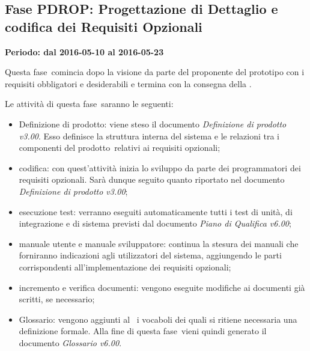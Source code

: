 \documentclass[../PianoProgetto.tex]{subfiles}
\begin{document}
	\subsection{Fase PDROP: Progettazione di Dettaglio e codifica dei Requisiti Opzionali}
		\textbf{Periodo: dal 2016-05-10 al 2016-05-23}
		
		Questa fase\g\ comincia dopo la visione da parte del proponente del prototipo con i requisiti obbligatori e desiderabili e termina con la consegna della \revisionediqualifica .

		Le attività di questa fase\g\ saranno le seguenti:
		\begin{itemize}
			\item Definizione di prodotto: viene steso il documento \textit{Definizione di prodotto v3.00}. Esso definisce la struttura interna del sistema e le relazioni tra i componenti del prodotto\g\ relativi ai requisiti opzionali;

			\item codifica: con quest'attività inizia lo sviluppo da parte dei programmatori dei requisiti opzionali. Sarà dunque seguito quanto riportato nel documento \textit{Definizione di prodotto v3.00};

			\item esecuzione test: verranno eseguiti automaticamente tutti i test di unità, di integrazione e di sistema previsti dal documento \textit{Piano di Qualifica v6.00};

			\item manuale utente e manuale sviluppatore: continua la stesura dei manuali che forniranno indicazioni agli utilizzatori del sistema, aggiungendo le parti corrispondenti all'implementazione dei requisiti opzionali;

			\item incremento e verifica documenti: vengono eseguite modifiche ai documenti già scritti, se necessario;
			
			\item Glossario: vengono aggiunti al \glossario\ i vocaboli dei quali si ritiene necessaria una definizione formale. Alla fine di questa fase\g\ vieni quindi generato il documento \textit{Glossario v6.00}.
		\end{itemize}
		
		
\end{document}
